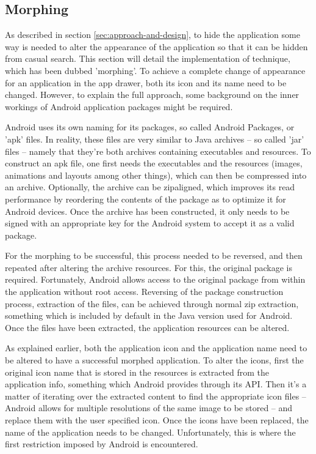 \subsection{Morphing}
\label{sec:morphing}

As described in section \ref{sec:approach-and-design}, to hide the application some way is needed to alter the appearance of the application so that it can be hidden from casual search.
This section will detail the implementation of technique, which has been dubbed 'morphing'.
To achieve a complete change of appearance for an application in the app drawer, both its icon and its name need to be changed. 
However, to explain the full approach, some background on the inner workings of Android application packages might be required.

Android uses its own naming for its packages, so called Android Packages, or 'apk' files.
In reality, these files are very similar to Java archives -- so called 'jar' files -- namely that they're both archives containing executables and resources.
To construct an apk file, one first needs the executables and the resources (images, animations and layouts among other things), which can then be compressed into an archive.
Optionally, the archive can be zipaligned, which improves its read performance by reordering the contents of the package as to optimize it for Android devices.
Once the archive has been constructed, it only needs to be signed with an appropriate key for the Android system to accept it as a valid package.

For the morphing to be successful, this process needed to be reversed, and then repeated after altering the archive resources.
For this, the original package is required. 
Fortunately, Android allows access to the original package from within the application without root access.
Reversing of the package construction process, extraction of the files, can be achieved through normal zip extraction, something which is included by default in the Java version used for Android.
Once the files have been extracted, the application resources can be altered.

As explained earlier, both the application icon and the application name need to be altered to have a successful morphed application.
To alter the icons, first the original icon name that is stored in the resources is extracted from the application info, something which Android provides through its API.
Then it's a matter of iterating over the extracted content to find the appropriate icon files -- Android allows for multiple resolutions of the same image to be stored -- and replace them with the user specified icon.
Once the icons have been replaced, the name of the application needs to be changed.
Unfortunately, this is where the first restriction imposed by Android is encountered.

